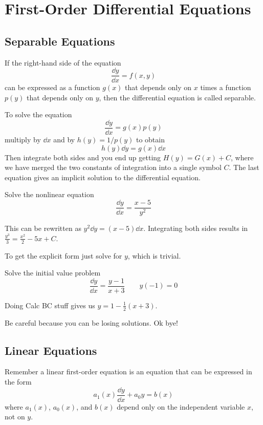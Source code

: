 \documentclass[../diffeq.tex]{subfiles}
\begin{document}
\chapter{First-Order Differential Equations}
\section{Separable Equations}
\begin{definition}
    If the right-hand side of the equation 
    \[ \frac{\dd y}{\dd x}=f(x,y) \]
    can be expressed as a function $g(x)$ that depends only on $x$ times a function $p(y)$ that depends only on $y$, then the differential equation is called separable.
\end{definition}

To solve the equation 
\[ \frac{\dd y}{\dd x}=g(x)p(y) \]
multiply by $\dd x$ and by $h(y)=1/p(y)$ to obtain 
\[h(y)\dd y=g(x)\dd x \]
Then integrate both sides and you end up getting $H(y)=G(x)+C$, where we have merged the two constants of integration into a single symbol $C$.
The last equation gives an implicit solution to the differential equation.

\begin{example}
    Solve the nonlinear equation 
    \[\frac{\dd y}{\dd x}=\frac{x-5}{y^2}\]

    This can be rewritten as $y^2\dd y = (x-5)\dd x$. Integrating both sides results in $\frac{y^3}{3}=\frac{x^2}{2}-5x+C$.

    To get the explicit form just solve for $y$, which is trivial.
\end{example}

\begin{example}
    Solve the initial value problem 
    \[ \frac{\dd y}{\dd x}=\frac{y-1}{x+3} \qquad y(-1)=0 \]

    Doing Calc BC stuff gives us $y=1-\frac{1}{2}(x+3)$.
\end{example}

Be careful because you can be losing solutions. Ok bye!

\section{Linear Equations}
Remember a linear first-order equation is an equation that can be expressed in the form 
\[ a_1(x)\frac{\dd y}{\dd x}+a_0 y=b(x) \]
where $a_1(x)$, $a_0(x)$, and $b(x)$ depend only on the independent variable $x$, not on $y$.
\end{document}
